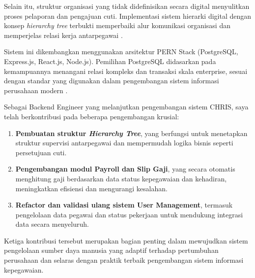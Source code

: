 Selain itu, struktur organisasi yang tidak didefinisikan secara digital 
menyulitkan proses pelaporan dan pengajuan cuti. Implementasi sistem hierarki 
digital dengan konsep \textit{hierarchy tree} terbukti memperbaiki alur komunikasi 
organisasi dan memperjelas relasi kerja antarpegawai \cite{kumar2024tree}.

Sistem ini dikembangkan menggunakan arsitektur PERN Stack (PostgreSQL, Express.js, 
React.js, Node.js). Pemilihan PostgreSQL didasarkan pada kemampuannya menangani 
relasi kompleks dan transaksi skala enterprise, sesuai dengan standar yang digunakan 
dalam pengembangan sistem informasi perusahaan modern \cite{arnold2019hrdbms}.

Sebagai Backend Engineer yang melanjutkan pengembangan sistem CHRIS, saya telah 
berkontribusi pada beberapa pengembangan krusial:

\begin{enumerate}
    \item \textbf{Pembuatan struktur \textit{Hierarchy Tree}}, yang berfungsi 
    untuk menetapkan struktur supervisi antarpegawai dan mempermudah logika 
    bisnis seperti persetujuan cuti.
    
    \item \textbf{Pengembangan modul Payroll dan Slip Gaji}, yang secara otomatis 
    menghitung gaji berdasarkan data status kepegawaian dan kehadiran, 
    meningkatkan efisiensi dan mengurangi kesalahan.
    
    \item \textbf{Refactor dan validasi ulang sistem User Management}, termasuk 
    pengelolaan data pegawai dan status pekerjaan untuk mendukung integrasi data 
    secara menyeluruh.
\end{enumerate}

Ketiga kontribusi tersebut merupakan bagian penting dalam mewujudkan sistem 
pengelolaan sumber daya manusia yang adaptif terhadap pertumbuhan perusahaan 
dan selaras dengan praktik terbaik pengembangan sistem informasi kepegawaian.



